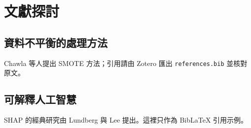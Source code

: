 \chapter{文獻探討}
\section{資料不平衡的處理方法}
Chawla 等人提出 SMOTE 方法\cite{chawla2002smote}；引用請由 Zotero 匯出 \texttt{references.bib} 並核對原文。
\section{可解釋人工智慧}
SHAP 的經典研究由 Lundberg 與 Lee 提出\cite{lundberg2017shap}。這裡只作為 BibLaTeX 引用示例。
